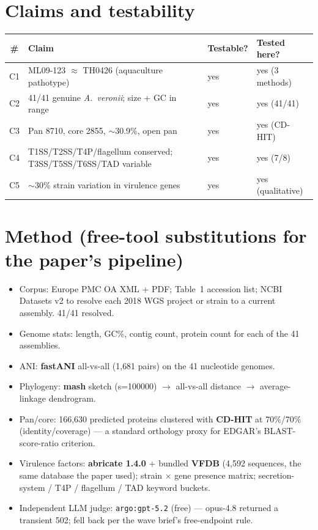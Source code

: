 \documentclass[11pt]{article}
\begin{document}
\section{Claims and testability}
\begin{longtable}{clll}
\toprule
\# & Claim & Testable? & Tested here? \\
\midrule
C1 & ML09-123 $\approx$ TH0426 (aquaculture pathotype) & yes & yes (3 methods) \\
C2 & 41/41 genuine \emph{A.\ veronii}; size + GC in range & yes & yes (41/41) \\
C3 & Pan 8710, core 2855, $\sim$30.9\%, open pan & yes & yes (CD-HIT) \\
C4 & T1SS/T2SS/T4P/flagellum conserved; T3SS/T5SS/T6SS/TAD variable & yes & yes (7/8) \\
C5 & $\sim$30\% strain variation in virulence genes & yes & yes (qualitative) \\
\bottomrule
\end{longtable}

\section{Method (free-tool substitutions for the paper's pipeline)}
\begin{itemize}
  \item Corpus: Europe PMC OA XML + PDF; Table~1 accession list; NCBI Datasets v2 to
        resolve each 2018 WGS project or strain to a current assembly. 41/41 resolved.
  \item Genome stats: length, GC\%, contig count, protein count for each of the 41 assemblies.
  \item ANI: \textbf{fastANI} all-vs-all (1{,}681 pairs) on the 41 nucleotide genomes.
  \item Phylogeny: \textbf{mash} sketch (s=100000) $\to$ all-vs-all distance $\to$
        average-linkage dendrogram.
  \item Pan/core: 166{,}630 predicted proteins clustered with \textbf{CD-HIT} at
        70\%/70\% (identity/coverage) --- a standard orthology proxy for EDGAR's
        BLAST-score-ratio criterion.
  \item Virulence factors: \textbf{abricate 1.4.0} $+$ bundled \textbf{VFDB}
        (4{,}592 sequences, the same database the paper used); strain $\times$ gene
        presence matrix; secretion-system / T4P / flagellum / TAD keyword buckets.
  \item Independent LLM judge: \texttt{argo:gpt-5.2} (free) --- opus-4.8 returned a
        transient 502; fell back per the wave brief's free-endpoint rule.
\end{itemize}
\end{document}
